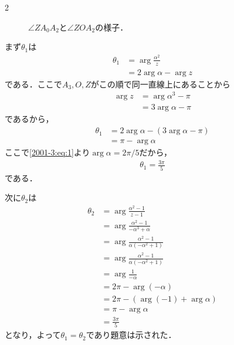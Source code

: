 \documentclass[../../../../main.tex]{subfiles}
\begin{document}
\begin{multicols}{2}
\begin{figure}[H]
    \caption{$\angle ZA_0A_2$と$\angle ZOA_2$の様子．}
    \label{2001-3:fig:4}
  \end{figure}

  まず$\theta_1$は
  \begin{align*}
    \theta_1
     & = \arg\frac{\alpha^2}{z} \\
     & = 2\arg \alpha - \arg z
  \end{align*}
  である．ここで$A_3,O,Z$がこの順で同一直線上にあることから
  \begin{align*}
    \arg z
     & = \arg \alpha^3 - \pi \\
     & = 3\arg \alpha - \pi
  \end{align*}
  であるから，
  \begin{align*}
    \theta_1
     & = 2 \arg \alpha - (3\arg \alpha - \pi) \\
     & = \pi - \arg \alpha
  \end{align*}
  ここで\cref{2001-3:eq:1}より$\arg\alpha=2\pi/5$だから，
  \begin{align*}
    \theta_1 = \frac{3\pi}{5}
  \end{align*}
  である．

  次に$\theta_2$は
  \begin{align*}
    \theta_2
     & =\arg\frac{\alpha^2-1}{z-1}                 \\
     & =\arg\frac{\alpha^2-1}{-\alpha^3+\alpha}    \\
     & =\arg\frac{\alpha^2-1}{\alpha(-\alpha^2+1)} \\
     & =\arg\frac{\alpha^2-1}{\alpha(-\alpha^2+1)} \\
     & =\arg\frac{1}{-\alpha}                      \\
     & =2\pi-\arg(-\alpha)                         \\
     & =2\pi-(\arg(-1)+\arg\alpha)                 \\
     & =\pi-\arg\alpha                             \\
     & = \frac{3\pi}{5}
  \end{align*}
  となり，よって$\theta_1=\theta_2$であり題意は示された．


\end{multicols}
\end{document}
